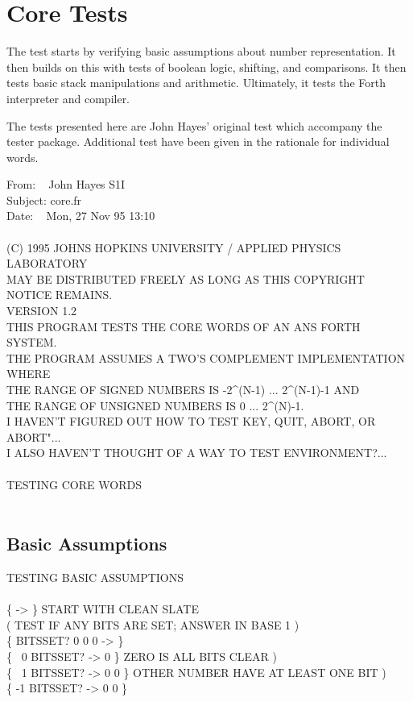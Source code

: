 \section{Core Tests} %

The test starts by verifying basic assumptions about number
representation. It then builds on this with tests of boolean logic,
shifting, and comparisons. It then tests basic stack manipulations
and arithmetic. Ultimately, it tests the Forth interpreter and
compiler.

The tests presented here are John Hayes' original test which
accompany the tester package. Additional test have been given in
the rationale for individual words.

\begin{tt}
 From: ~ John Hayes S1I \\
 Subject: core.fr \\
 Date: ~ Mon, 27 Nov 95 13:10 \\
\\
 (C) 1995 JOHNS HOPKINS UNIVERSITY / APPLIED PHYSICS LABORATORY \\
 MAY BE DISTRIBUTED FREELY AS LONG AS THIS COPYRIGHT NOTICE REMAINS. \\
 VERSION 1.2 \\
 THIS PROGRAM TESTS THE CORE WORDS OF AN ANS FORTH SYSTEM. \\
 THE PROGRAM ASSUMES A TWO'S COMPLEMENT IMPLEMENTATION WHERE \\
 THE RANGE OF SIGNED NUMBERS IS -2\textasciicircum(N-1) ... 2\textasciicircum(N-1)-1 AND \\
 THE RANGE OF UNSIGNED NUMBERS IS 0 ... 2\textasciicircum(N)-1. \\
 I HAVEN'T FIGURED OUT HOW TO TEST KEY, QUIT, ABORT, OR ABORT"... \\
 I ALSO HAVEN'T THOUGHT OF A WAY TO TEST ENVIRONMENT?... \\
\\
TESTING CORE WORDS \\
 \\
\end{tt}

\subsection{Basic Assumptions}

\begin{tt}
TESTING BASIC ASSUMPTIONS \\
\\
\{ -> \} \tab[8]  START WITH CLEAN SLATE \\
( TEST IF ANY BITS ARE SET; ANSWER IN BASE 1 ) \\
\{ \word{:} BITSSET?  0 0  0  \word{;} -> \} \\
\{ ~0 BITSSET? -> 0 \}		\tab[2.2]  ZERO IS ALL BITS CLEAR ) \\
\{ ~1 BITSSET? -> 0 0 \}	\tab[1.0]  OTHER NUMBER HAVE AT LEAST ONE BIT ) \\
\{ -1 BITSSET? -> 0 0 \}
\end{tt}

